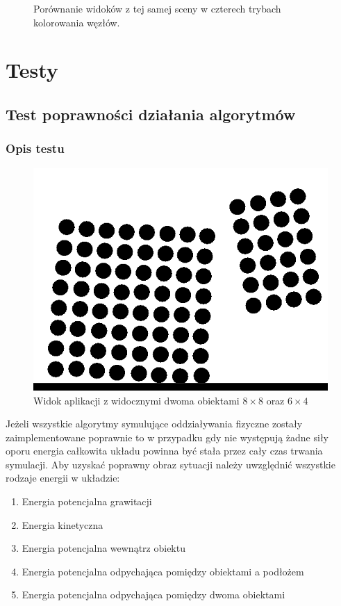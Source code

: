 \documentclass[12pt, letterpaper]{report}
\begin{document}
\begin{figure}[h]
        \caption{Porównanie widoków z tej samej sceny w czterech trybach kolorowania węzłów.}
    \end{figure}

\chapter{Testy}
    \section{Test poprawności działania algorytmów}
    \subsection{Opis testu}
    
    \begin{figure}
        \includegraphics[width=0.9\linewidth]{objects_raw} 
        \caption{Widok aplikacji z widocznymi dwoma obiektami $8 \times 8$ oraz $6 \times 4$}
    \end{figure}
    Jeżeli wszystkie algorytmy symulujące oddziaływania fizyczne zostały zaimplementowane poprawnie 
    to w przypadku gdy nie występują żadne siły oporu energia całkowita układu powinna 
    być stała przez cały czas trwania symulacji. Aby uzyskać poprawny obraz sytuacji należy 
    uwzględnić wszystkie rodzaje energii w układzie: 
    \begin{enumerate}
        \item Energia potencjalna grawitacji
        \item Energia kinetyczna
        \item Energia potencjalna wewnątrz obiektu
        \item Energia potencjalna odpychająca pomiędzy obiektami a podłożem
        \item Energia potencjalna odpychająca pomiędzy dwoma obiektami
    \end{enumerate}
\end{document}
